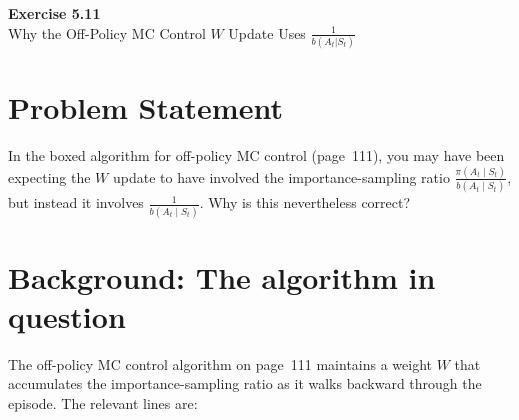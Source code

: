 \documentclass[11pt]{article}
\begin{document}
\newpage

\begin{center}
    {\Large\color{garnet}\textbf{Exercise 5.11}}\\[6pt]
    {\large Why the Off-Policy MC Control $W$ Update Uses $\frac{1}{b(A_t|S_t)}$}
\end{center}

\section*{Problem Statement}

In the boxed algorithm for off-policy MC control (page~111), you may have been expecting the $W$ update to have involved the importance-sampling ratio $\frac{\pi(A_t \mid S_t)}{b(A_t \mid S_t)}$, but instead it involves $\frac{1}{b(A_t \mid S_t)}$. Why is this nevertheless correct?

\section*{Background: The algorithm in question}

The off-policy MC control algorithm on page~111 maintains a weight $W$ that accumulates the importance-sampling ratio as it walks backward through the episode. The relevant lines are:

\begin{center}
\end{center}
\end{document}
